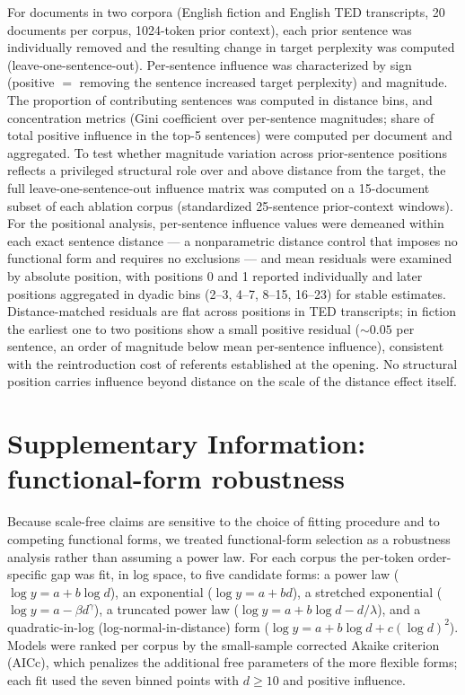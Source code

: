 \documentclass[11pt]{article}
\begin{document}
For documents in two corpora (English fiction and English TED transcripts, 20 documents per corpus,
1024-token prior context), each prior sentence was individually removed and the resulting change in
target perplexity was computed (leave-one-sentence-out). Per-sentence influence was characterized by
sign (positive $=$ removing the sentence increased target perplexity) and magnitude. The proportion
of contributing sentences was computed in distance bins, and concentration metrics (Gini coefficient
over per-sentence magnitudes; share of total positive influence in the top-5 sentences) were computed
per document and aggregated. To test whether magnitude variation across prior-sentence positions
reflects a privileged structural role over and above distance from the target, the full
leave-one-sentence-out influence matrix was computed on a 15-document subset of each ablation corpus
(standardized 25-sentence prior-context windows). For the positional analysis, per-sentence
influence values were demeaned within each exact sentence distance --- a nonparametric distance
control that imposes no functional form and requires no exclusions --- and mean residuals were
examined by absolute position, with positions 0 and 1 reported individually and later positions
aggregated in dyadic bins (2--3, 4--7, 8--15, 16--23) for stable estimates.
Distance-matched residuals are flat across positions in TED transcripts; in fiction the earliest
one to two positions show a small positive residual (${\sim}0.05$ per sentence, an order of
magnitude below mean per-sentence influence), consistent with the reintroduction cost of referents
established at the opening. No structural position carries influence beyond distance on the scale
of the distance effect itself.

\section*{Supplementary Information: functional-form robustness}

Because scale-free claims are sensitive to the choice of fitting procedure and to
competing functional forms, we treated functional-form selection as a robustness analysis
rather than assuming a power law. For each corpus the per-token order-specific gap was fit,
in log space, to five candidate forms: a power law ($\log y = a + b\log d$), an exponential
($\log y = a + bd$), a stretched exponential ($\log y = a - \beta d^{\gamma}$), a truncated
power law ($\log y = a + b\log d - d/\lambda$), and a quadratic-in-log (log-normal-in-distance)
form ($\log y = a + b\log d + c(\log d)^2$). Models were ranked per corpus by the small-sample
corrected Akaike criterion (AICc), which penalizes the additional free parameters of the more
flexible forms; each fit used the seven binned points with $d \geq 10$ and positive influence.
\end{document}
